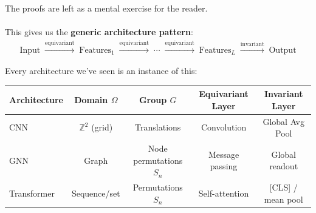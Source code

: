 The proofs are left as a mental exercise for the reader.
\\
\\
This gives us the \textbf{generic architecture pattern}:
\begin{align*}
    \text{Input} \;\xrightarrow{\text{equivariant}}\;
    \text{Features}_1 \;\xrightarrow{\text{equivariant}}\;
    \cdots \;\xrightarrow{\text{equivariant}}\;
    \text{Features}_L \;\xrightarrow{\text{invariant}}\;
    \text{Output}
\end{align*}

\noindent
Every architecture we've seen is an instance of this:

\begin{center}
\renewcommand{\arraystretch}{1.4}
\begin{tabular}{l c c c c}
    \hline
    \textbf{Architecture} & \textbf{Domain $\Omega$} & \textbf{Group $G$}
    & \textbf{Equivariant Layer} & \textbf{Invariant Layer} \\
    \hline
    CNN & $\mathbb{Z}^2$ (grid) & Translations & Convolution & Global Avg Pool \\
    GNN & Graph & Node permutations $S_n$ & Message passing & Global readout \\
    Transformer & Sequence/set & Permutations $S_n$ & Self-attention & [CLS] / mean pool \\
    \hline
\end{tabular}
\end{center}

